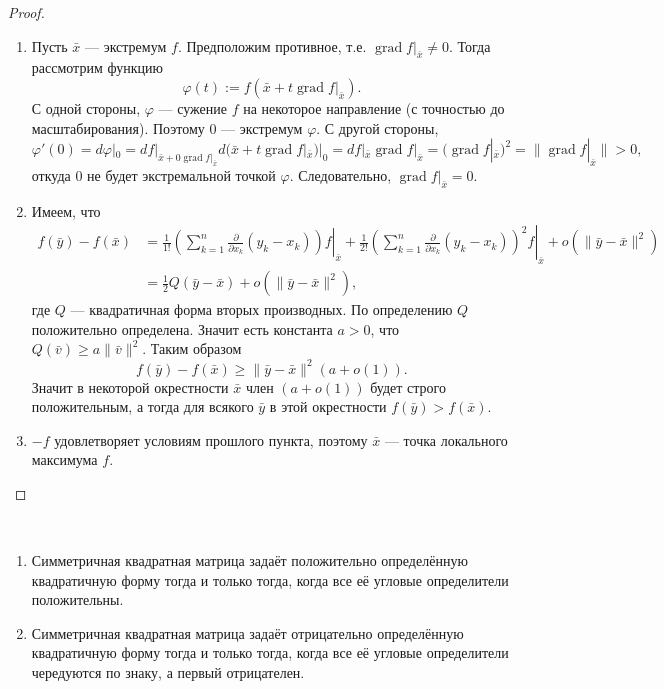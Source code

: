 \documentclass[12pt,a4paper]{article}
\DeclareMathOperator{\grad}{grad}
\begin{document}
    \begin{proof}
        \begin{enumerate}
            \item Пусть $\bar{x}$ --- экстремум $f$. Предположим противное, т.е. $\grad f|_{\bar{x}} \neq 0$. Тогда рассмотрим функцию
                \[\varphi(t) := f(\bar{x} + t\grad f|_{\bar{x}}).\]
                С одной стороны, $\varphi$ --- сужение $f$ на некоторое направление (с точностью до масштабирования). Поэтому $0$ --- экстремум $\varphi$. С другой стороны,
                \[
                    \varphi'(0)
                    = d\varphi|_0
                    = df|_{\bar{x} + 0 \grad f|_{\bar{x}}} d(\bar{x} + t\grad f|_{\bar{x}})|_0
                    = df|_{\bar{x}} \grad f|_{\bar{x}}
                    = (\grad f|_{\bar{x}})^2
                    = \|\grad f|_{\bar{x}}\|
                    > 0,
                \]
                откуда $0$ не будет экстремальной точкой $\varphi$. Следовательно, $\grad f|_{\bar{x}} = 0$.
            \item Имеем, что
                \begin{align*}
                    f(\bar{y}) - f(\bar{x})
                    &= \frac{1}{1!}\left.\left(\sum_{k=1}^n \frac{\partial}{\partial x_k} (y_k - x_k)\right) f \right|_{\bar{x}}
                    + \frac{1}{2!}\left.\left(\sum_{k=1}^n \frac{\partial}{\partial x_k} (y_k - x_k)\right)^2 f \right|_{\bar{x}}
                    + o(\|\bar{y}-\bar{x}\|^2)\\
                    &= \frac{1}{2} Q(\bar{y} - \bar{x}) + o(\|\bar{y}-\bar{x}\|^2),
                \end{align*}
                где $Q$ --- квадратичная форма вторых производных. По определению $Q$ положительно определена. Значит есть константа $a > 0$, что $Q(\bar{v}) \geqslant a \|\bar{v}\|^2$. Таким образом
                \[f(\bar{y}) - f(\bar{x}) \geqslant \|\bar{y} - \bar{x}\|^2 (a + o(1)).\]
                Значит в некоторой окрестности $\bar{x}$ член $(a + o(1))$ будет строго положительным, а тогда для всякого $\bar{y}$ в этой окрестности $f(\bar{y}) > f(\bar{x})$.
            \item $-f$ удовлетворяет условиям прошлого пункта, поэтому $\bar{x}$ --- точка локального максимума $f$.
        \end{enumerate}
    \end{proof}

    \begin{theorem}\ 
        \begin{enumerate}
            \item Симметричная квадратная матрица задаёт положительно определённую квадратичную форму тогда и только тогда, когда все её угловые определители положительны.
            \item Симметричная квадратная матрица задаёт отрицательно определённую квадратичную форму тогда и только тогда, когда все её угловые определители чередуются по знаку, а первый отрицателен.
        \end{enumerate}
    \end{theorem}
\end{document}
